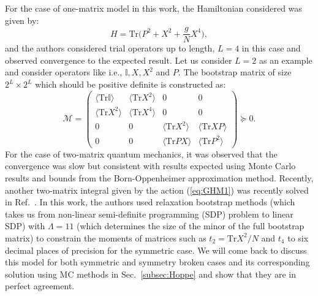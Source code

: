 \documentclass[letter,11pt]{article}
\begin{document}
For the case of one-matrix model in this work, the Hamiltonian considered was given by:
\begin{equation}
H = \mbox{Tr} \Big( P^2 + X^2 + \frac{g}{N} X^4 \Big),
\end{equation}
and the authors considered trial operators up to length, $L = 4$ in this case 
and observed convergence to the expected result. 
Let us consider $L=2$ as an example and consider operators like 
i.e., $\mathbb{I}, X, X^{2}$ and $P$. The bootstrap matrix
of size $2^L \times 2^L$ 
which should be positive definite is constructed as:
\begin{equation}
	\mathcal{M} = 
	\begin{pmatrix}
		\langle \mbox{Tr}\mathbb{I} \rangle & \langle \mbox{Tr} X^2 \rangle & 0 & 0 \\
		\langle \mbox{Tr} X^2 \rangle & \langle \mbox{Tr} X^4 \rangle  & 0 & 0 \\ 
		0 & 0 & \langle \mbox{Tr} X^2 \rangle & \langle \mbox{Tr} XP \rangle \\
		0 & 0  & \langle \mbox{Tr} PX \rangle & \langle \mbox{Tr} P^2 \rangle
	\end{pmatrix}  \succeq 0. 
\end{equation}
For the case of two-matrix quantum mechanics, it was observed that the convergence
was slow but consistent with results expected using Monte Carlo results and bounds from the Born-Oppenheimer approximation method. Recently, another two-matrix integral given by the action (\ref{eq:GHM1}) was recently solved in Ref.~\cite{Kazakov:2021lel}. 
In this work, the authors used relaxation bootstrap methods (which takes us 
from non-linear semi-definite programming (SDP) problem to linear SDP) with
$\Lambda=11$ (which determines the size of the minor of the full bootstrap matrix) 
to constrain the moments of matrices such as $t_{2} = \mathrm{Tr}X^2/N$ and $t_{4}$ 
to six decimal places of precision for the symmetric case. We will come back to 
discuss this model for both symmetric and symmetry broken cases 
and its corresponding solution using MC methods in Sec.~\ref{subsec:Hoppe} 
and show that they are in perfect agreement.  
\end{document}
